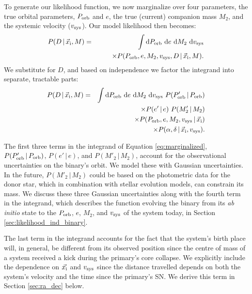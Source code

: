\documentclass[usenatbib]{mnras}
\newcommand{\given}{\,|\,}
\newcommand{\dd}{\mathrm{d}}
\begin{document}
To generate our likelihood function, we now marginalize over four parameters, the true orbital parameters, $P_{\rm orb}$ and $e$, the true (current) companion mass $M_2$, and the systemic velocity ($v_{\rm sys}$). Our model likelihood then becomes:
\begin{eqnarray}
P(D \given \vec{x}_{\rm i}, M) &=& \int \dd P_{\rm orb}\ \dd e\ \dd M_2\ \dd v_{\rm sys} \nonumber \\
& & \qquad \times P( P_{\rm orb}, e, M_2, v_{\rm sys}, D \given \vec{x}_{\rm i}, M).
\end{eqnarray}
We substitute for $D$, and based on independence we factor the integrand into separate, tractable parts:
\begin{eqnarray}
P(D \given \vec{x}_{\rm i}, M) &=&  \int \dd P_{\rm orb}\ \dd e\ \dd M_2\ \dd v_{\rm sys}\ P(P'_{\rm orb} \given P_{\rm orb}) \nonumber \\
	& & \qquad \times P(e' \given e)\ P(M'_2 \given M_2) \nonumber \\
	& & \qquad \times P(P_{\rm orb}, e, M_2, v_{\rm sys} \given \vec{x}_{\rm i}) \nonumber \\
	& & \qquad \times P(\alpha, \delta \given \vec{x}_{\rm i}, v_{\rm sys}). \label{eq:marginalized}
\end{eqnarray}


The first three terms in the integrand of Equation \ref{eq:marginalized}, $P(P'_{\rm orb} \given P_{\rm orb})$, $P(e' \given e)$, and $P(M'_2 \given M_2)$, account for the observational uncertainties on the binary's orbit. We model these with Gaussian uncertainties. In the future, $P(M'_2 \given M_2)$ could be based on the photometric data for the donor star, which in combination with stellar evolution models, can constrain its mass. We discuss these three Gaussian uncertainties along with the fourth term in the integrand, which describes the function evolving the binary from its {\it ab initio} state to the $P_{\rm orb}$, $e$, $M_2$, and $v_{\rm sys}$ of the system today, in Section \ref{sec:likelihood_ind_binary}.

The last term in the integrand accounts for the fact that the system's birth place will, in general, be different from its observed position since the centre of mass of a system received a kick during the primary's core collapse. We explicitly include the dependence on $\vec{x_{\rm i}}$ and $v_{\rm sys}$ since the distance travelled depends on both the system's velocity and the time since the primary's SN. We derive this term in Section \ref{sec:ra_dec} below.
\end{document}
